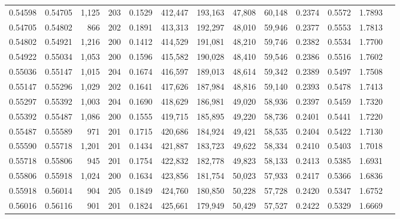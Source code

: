 \begin{tabular}{rrrrrrrrrrrrr}
0.54598 & 0.54705 & 1,125 & 203 &                                     0.1529 & 412,447 & 193,163 &  47,808 &  60,148 & 0.2374 & 0.5572 & 1.7893 \\
0.54705 & 0.54802 &   866 & 202 &                                     0.1891 & 413,313 & 192,297 &  48,010 &  59,946 & 0.2377 & 0.5553 & 1.7813 \\
0.54802 & 0.54921 & 1,216 & 200 &                                     0.1412 & 414,529 & 191,081 &  48,210 &  59,746 & 0.2382 & 0.5534 & 1.7700 \\
0.54922 & 0.55034 & 1,053 & 200 &                                     0.1596 & 415,582 & 190,028 &  48,410 &  59,546 & 0.2386 & 0.5516 & 1.7602 \\
0.55036 & 0.55147 & 1,015 & 204 &                                     0.1674 & 416,597 & 189,013 &  48,614 &  59,342 & 0.2389 & 0.5497 & 1.7508 \\
0.55147 & 0.55296 & 1,029 & 202 &                                     0.1641 & 417,626 & 187,984 &  48,816 &  59,140 & 0.2393 & 0.5478 & 1.7413 \\
0.55297 & 0.55392 & 1,003 & 204 &                                     0.1690 & 418,629 & 186,981 &  49,020 &  58,936 & 0.2397 & 0.5459 & 1.7320 \\
0.55392 & 0.55487 & 1,086 & 200 &                                     0.1555 & 419,715 & 185,895 &  49,220 &  58,736 & 0.2401 & 0.5441 & 1.7220 \\
0.55487 & 0.55589 &   971 & 201 &                                     0.1715 & 420,686 & 184,924 &  49,421 &  58,535 & 0.2404 & 0.5422 & 1.7130 \\
0.55590 & 0.55718 & 1,201 & 201 &                                     0.1434 & 421,887 & 183,723 &  49,622 &  58,334 & 0.2410 & 0.5403 & 1.7018 \\
0.55718 & 0.55806 &   945 & 201 &                                     0.1754 & 422,832 & 182,778 &  49,823 &  58,133 & 0.2413 & 0.5385 & 1.6931 \\
0.55806 & 0.55918 & 1,024 & 200 &                                     0.1634 & 423,856 & 181,754 &  50,023 &  57,933 & 0.2417 & 0.5366 & 1.6836 \\
0.55918 & 0.56014 &   904 & 205 &                                     0.1849 & 424,760 & 180,850 &  50,228 &  57,728 & 0.2420 & 0.5347 & 1.6752 \\
0.56016 & 0.56116 &   901 & 201 &                                     0.1824 & 425,661 & 179,949 &  50,429 &  57,527 & 0.2422 & 0.5329 & 1.6669 \\

\end{tabular}
